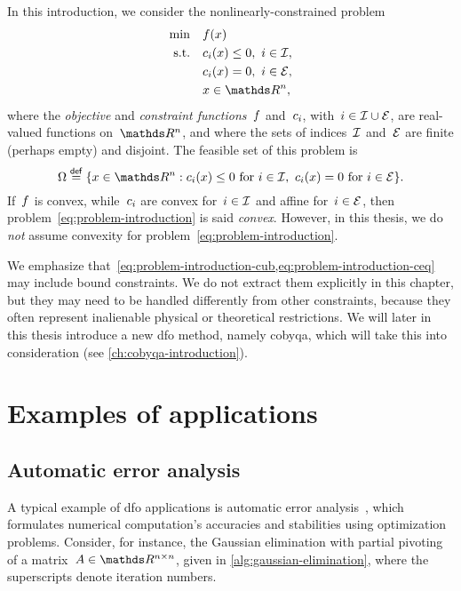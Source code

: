 In this introduction, we consider the nonlinearly-constrained problem
\begin{subequations}
    \label{eq:problem-introduction}
    \begin{align}
        \min        & \quad \obj(x)\\
        \text{s.t.} & \quad \con{i}(x) \le 0, ~ i \in \iub, \label{eq:problem-introduction-cub}\\
                    & \quad \con{i}(x) = 0, ~ i \in \ieq, \label{eq:problem-introduction-ceq}\\
                    & \quad x \in \R^n, \nonumber
    \end{align}
\end{subequations}
where the \emph{objective} and \emph{constraint functions}~$f$ and~$c_{i}$, with~$i \in \mathcal{I} \cup \mathcal{E}$, are real-valued functions on~$\R^n$, and where the sets of indices~$\mathcal{I}$ and~$\mathcal{E}$ are finite (perhaps empty) and disjoint.
The feasible set of this problem is
\begin{equation*}
    \Omega \eqdef \set{x \in \R^n : \con{i}(x) \le 0 ~ \text{for~$i \in \iub$}, ~ \con{i}(x) = 0 ~ \text{for~$i \in \ieq$}}.
\end{equation*}
If~$f$ is convex, while~$c_{i}$ are convex for~$i \in \mathcal{I}$ and affine for~$i \in \mathcal{E}$, then problem~\cref{eq:problem-introduction} is said \emph{convex}.
However, in this thesis, we do \emph{not} assume convexity for problem~\cref{eq:problem-introduction}.

We emphasize that~\cref{eq:problem-introduction-cub,eq:problem-introduction-ceq} may include bound constraints.
We do not extract them explicitly in this chapter, but they may need to be handled differently from other constraints, because they often represent inalienable physical or theoretical restrictions.
We will later in this thesis introduce a new \gls{dfo} method, namely \gls{cobyqa}, which will take this into consideration (see \cref{ch:cobyqa-introduction}).

\section{Examples of applications}

\subsection{Automatic error analysis}

A typical example of \gls{dfo} applications is automatic error analysis~\cite{Higham_1993,Higham_2002}, which formulates numerical computation's accuracies and stabilities using optimization problems.
Consider, for instance, the Gaussian elimination with partial pivoting of a matrix~$A \in \R^{n \times n}$, given in \cref{alg:gaussian-elimination}, where the superscripts denote iteration numbers.

